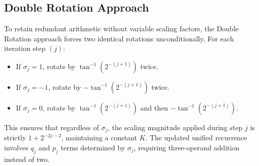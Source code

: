 \documentclass{article}
\begin{document}
\subsection{Double Rotation Approach}
To retain redundant arithmetic without variable scaling factors, the Double Rotation approach forces two identical rotations unconditionally. For each iteration step $(j)$:
\begin{itemize}
    \item If $\sigma_j = 1$, rotate by $\tan^{-1}(2^{-(j+1)})$ twice.
    \item If $\sigma_j = -1$, rotate by $-\tan^{-1}(2^{-(j+1)})$ twice.
    \item If $\sigma_j = 0$, rotate by $\tan^{-1}(2^{-(j+1)})$ and then $-\tan^{-1}(2^{-(j+1)})$.
\end{itemize}
This ensures that regardless of $\sigma_j$, the scaling magnitude applied during step $j$ is strictly $1+2^{-2j-2}$, maintaining a constant $K$. The updated unified recurrence involves $q_j$ and $p_j$ terms determined by $\sigma_j$, requiring three-operand addition instead of two.
\end{document}
